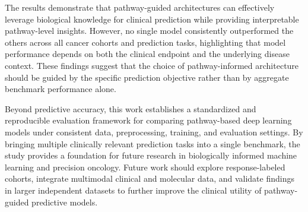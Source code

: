 \documentclass[sigconf]{acmart}
\begin{document}
The results demonstrate that pathway-guided architectures can effectively leverage biological knowledge for clinical prediction while providing interpretable pathway-level insights. However, no single model consistently outperformed the others across all cancer cohorts and prediction tasks, highlighting that model performance depends on both the clinical endpoint and the underlying disease context. These findings suggest that the choice of pathway-informed architecture should be guided by the specific prediction objective rather than by aggregate benchmark performance alone.

Beyond predictive accuracy, this work establishes a standardized and reproducible evaluation framework for comparing pathway-based deep learning models under consistent data, preprocessing, training, and evaluation settings. By bringing multiple clinically relevant prediction tasks into a single benchmark, the study provides a foundation for future research in biologically informed machine learning and precision oncology. Future work should explore response-labeled cohorts, integrate multimodal clinical and molecular data, and validate findings in larger independent datasets to further improve the clinical utility of pathway-guided predictive models.



\end{document}
